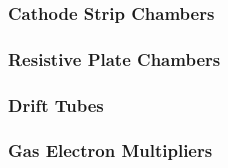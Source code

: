 \subsubsection{Cathode Strip Chambers} \label{sec:CSC}


\subsubsection{Resistive Plate Chambers} \label{sec:RPC}


\subsubsection{Drift Tubes} \label{sec:DT}


\subsubsection{Gas Electron Multipliers} \label{sec:GEM}
